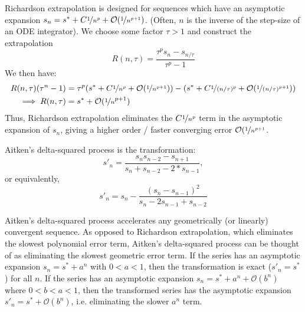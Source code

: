 \documentclass{puthesis}
\begin{document}
Richardson extrapolation is designed for sequences which have an asymptotic
expansion $s_n = s^* + C \nicefrac{1}{n^p} + \mathcal{O}(\nicefrac{1}{n^{p+1}})$. (Often, $n$ is the inverse of the
step-size of an ODE integrator).
We choose some factor $\tau > 1$ and construct the extrapolation
\[
R(n, \tau) = \frac{\tau^p s_n - s_{n/\tau}}{\tau^p - 1}
\]
We then have:
\begin{align*}
R(n, \tau)(\tau^n - 1) &= \tau^p(s^* + C \nicefrac{1}{n^p} + \mathcal{O}(\nicefrac{1}{n^{p+1}})) - (s^* + C \nicefrac{1}{(n/\tau)^p} + \mathcal{O}(\nicefrac{1}{(n/\tau)^{p+1}}))\\
\implies R(n, \tau) &= s^* + \mathcal{O}(\nicefrac{1}{n}^{p+1})
\end{align*}
Thus, Richardson extrapolation eliminates the $C \nicefrac{1}{n^p}$ term in
the asymptotic expansion of $s_n$, giving a higher order / faster converging error
$\mathcal{O}(\nicefrac{1}{n^{p+1}}$.

Aitken's delta-squared process is the transformation:
\[
s'_n = \frac{s_n s_{n-2} - s_{n+1}}{s_n + s_{n-2} - 2*s_{n-1}},
\]
or equivalently,
\[
s'_n = s_n - \frac{(s_n - s_{n-1})^2}{s_n - 2 s_{n-1} + s_{n-2}}
\]

Aitken's delta-squared process accelerates any geometrically (or linearly)
convergent sequence.
As opposed to Richardson extrapolation, which eliminates the slowest polynomial error term, Aitken's delta-squared process can be thought of as eliminating the slowest geometric error term.
If the series has an asymptotic expansion $s_n = s^* + a^n$ with $0 < a < 1$, then the transformation is exact ($s'_n = s^*$) for all $n$. If the series has an asymptotic expansion $s_n = s^* + a^n + \mathcal{O}(b^n)$   where $0 < b < a < 1$, then the transformed series has the asymptotic
expansion $s'_n = s^* + \mathcal{O}(b^n)$, i.e. eliminating the slower
$a^n$ term.
\end{document}
